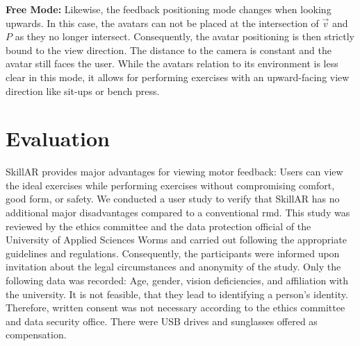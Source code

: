 \textbf{Free Mode:}
Likewise, the feedback positioning mode changes when looking upwards. In this case, the avatars can not be placed at the intersection of $\vec{v}$ and $P$ as they no longer intersect. Consequently, the avatar positioning is then strictly bound to the view direction. The distance to the camera is constant and the avatar still faces the user. While the avatars relation to its environment is less clear in this mode, it allows for performing exercises with an upward-facing view direction like sit-ups or bench press.

\section{Evaluation}
SkillAR provides major advantages for viewing motor feedback: Users can view the ideal exercises while performing exercises without compromising comfort, good form, or safety. We conducted a user study to verify that SkillAR has no additional major disadvantages compared to a conventional \acrshort{rmd}. This study was reviewed by the ethics committee and the data protection official of the University of Applied Sciences Worms and carried out following the appropriate guidelines and regulations. Consequently, the participants were informed upon invitation about the legal circumstances and anonymity of the study. Only the following data was recorded: Age, gender, vision deficiencies, and affiliation with the university. It is not feasible, that they lead to identifying a person's identity. Therefore, written consent was not necessary according to the ethics committee and data security office. There were USB drives and sunglasses offered as compensation.

